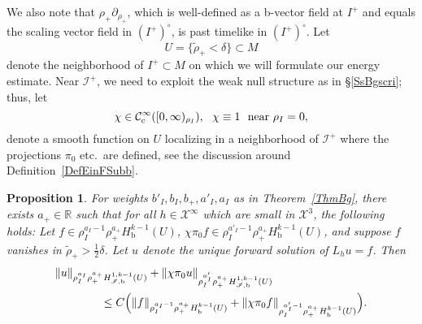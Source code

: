 \documentclass[reqno,11pt,letterpaper]{amsart}
\numberwithin{equation}{section}
\numberwithin{figure}{section}
\newtheorem{prop}[thm]{Proposition}
\theoremstyle{definition}
\theoremstyle{remark}
\newcommand{\mc}{\mathcal}
\newcommand{\cC}{\mc C}
\newcommand{\cX}{\mc X}
\newcommand{\ms}{\mathscr}
\newcommand{\scri}{\ms I}
\newcommand{\R}{\mathbb{R}}
\newcommand{\pa}{\partial}
\newcommand{\tn}{\textnormal}
\newcommand{\wt}{\widetilde}
\newcommand{\bop}{{\mathrm{b}}}
\newcommand{\cp}{{\mathrm{c}}}
\newcommand{\half}{\tfrac{1}{2}}
\newcommand{\CIc}{\cC^\infty_\cp}
\newcommand{\Hb}{H_{\bop}}
\newcommand{\Hscrib}{H_{\scri,\bop}}
\newcommand{\usref}[1]{{\upshape\ref{#1}}}
\begin{document}
We also note that $\rho_+\pa_{\rho_+}$, which is well-defined as a b-vector field at $I^+$ and equals the scaling vector field in $(I^+)^\circ$, is past timelike in $(I^+)^\circ$. Let
\[
  U = \{ \wt\rho_+<\delta \} \subset M
\]
denote the neighborhood of $I^+\subset M$ on which we will formulate our energy estimate. Near $\scri^+$, we need to exploit the weak null structure as in \S\ref{SsBgscri}; thus, let
\begin{equation}
\label{EqBgipChi}
  \chi \in \CIc([0,\infty)_{\rho_I}),\ \ 
  \chi\equiv 1\ \ \tn{near}\ \rho_I=0,
\end{equation}
denote a smooth function on $U$ localizing in a neighborhood of $\scri^+$ where the projections $\pi_0$ etc.\ are defined, see the discussion around Definition~\ref{DefEinFSubb}.

\begin{prop}
\label{PropBgip}
  For weights $b'_I,b_I,b_+,a'_I,a_I$ as in Theorem~\usref{ThmBg}, there exists $a_+\in\R$ such that for all $h\in\cX^\infty$ which are small in $\cX^3$, the following holds: Let $f\in\rho_I^{a_I-1}\rho_+^{a_+}\Hb^{k-1}(U)$, $\chi\pi_0 f\in\rho_I^{a'_I-1}\rho_+^{a_+}\Hb^{k-1}(U)$, and suppose $f$ vanishes in $\wt\rho_+>\half\delta$. Let $u$ denote the unique forward solution of $L_h u=f$. Then
  \begin{equation}
  \label{EqBgip}
  \begin{split}
    &\|u\|_{\rho_I^{a_I}\rho_+^{a_+}\Hscrib^{1,k-1}(U)} + \|\chi\pi_0 u\|_{\rho_I^{a'_I}\rho_+^{a_+}\Hscrib^{1,k-1}(U)} \\
    &\qquad\qquad \leq C\Bigl(\|f\|_{\rho_I^{a_I-1}\rho_+^{a_+}\Hb^{k-1}(U)} + \|\chi\pi_0 f\|_{\rho_I^{a'_I-1}\rho_+^{a_+}\Hb^{k-1}(U)}\Bigr).
  \end{split}
  \end{equation}
\end{prop}
\end{document}

